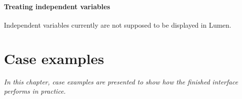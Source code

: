 \documentclass{article}
\begin{document}
\paragraph{Treating independent variables}
 Independent variables currently are not supposed to be displayed in Lumen.
 

\section{Case examples}

\textit{In this chapter, case examples are presented to show how the finished interface performs in practice.}
\end{document}
